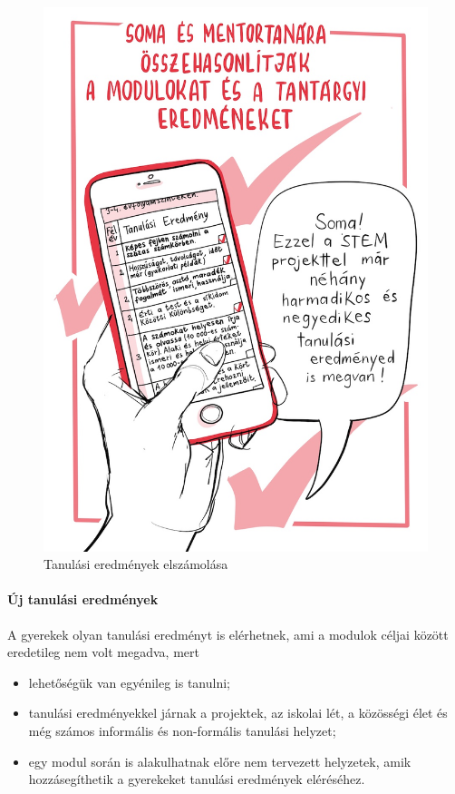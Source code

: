 \begin{figure}
\centering
\includegraphics{pics/6a_tantargyi_soma.jpg}
\caption{Tanulási eredmények elszámolása}
\end{figure}

\hypertarget{uj-tanulasi-eredmenyek}{%
\paragraph{Új tanulási eredmények}\label{uj-tanulasi-eredmenyek}}

A gyerekek olyan tanulási eredményt is elérhetnek, ami a modulok céljai
között eredetileg nem volt megadva, mert

\begin{itemize}
\item
  lehetőségük van egyénileg is tanulni;
\item
  tanulási eredményekkel járnak a projektek, az iskolai lét, a közösségi
  élet és még számos informális és non-formális tanulási helyzet;
\item
  egy modul során is alakulhatnak előre nem tervezett helyzetek, amik
  hozzásegíthetik a gyerekeket tanulási eredmények eléréséhez.
\end{itemize}

